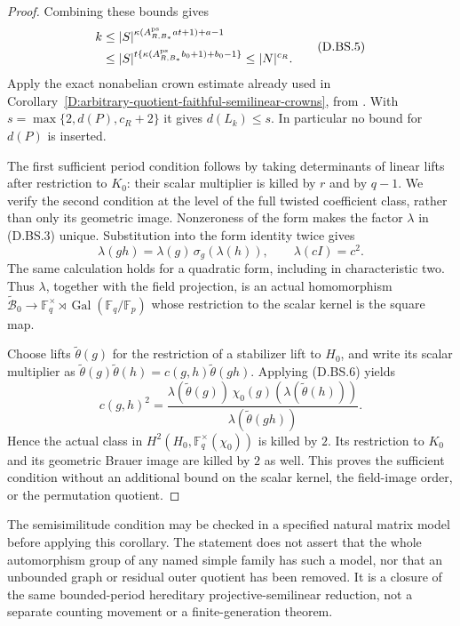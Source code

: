 \begin{proof}
Combining these bounds gives
\[
 \begin{aligned}
 k&\le |S|^{\kappa(A_{R,B_*}^{\rm ps}at+1)+a-1}\\
  &\le |S|^{t\{\kappa(A_{R,B_*}^{\rm ps}b_0+1)+b_0-1\}}
   \le |N|^{c_R}.
 \end{aligned}                                         \tag{D.BS.5}
\]
Apply the exact nonabelian crown estimate already
used in
Corollary~\ref{D:arbitrary-quotient-faithful-semilinear-crowns},
from \citet[proof of Proposition 2.6(ii),
equations (2.1)--(2.2), pp.11--13]{LucchiniMarionTracey2020D}.
With $s=\max\{2,d(P),c_R+2\}$ it gives $d(L_k)\le s$.
In particular no bound for $d(P)$ is inserted.

The first sufficient period condition follows by
taking determinants of linear lifts after restriction
to $K_0$: their scalar multiplier is killed by $r$
and by $q-1$.
We verify the second condition at the level of the
full twisted coefficient class, rather than only its
geometric image. Nonzeroness of the form makes the
factor $\lambda$ in (D.BS.3) unique. Substitution
into the form identity twice gives
\[
 \lambda(gh)=\lambda(g)\,\sigma_g(\lambda(h)),
 \qquad \lambda(cI)=c^2 .
                                                        \tag{D.BS.6}
\]
The same calculation holds for a quadratic form,
including in characteristic two. Thus $\lambda$,
together with the field projection, is an actual
homomorphism
$\widetilde{\mathcal B}_0\to
\mathbb F_q^\times\rtimes\operatorname{Gal}(\mathbb F_q/\mathbb F_p)$
whose restriction to the scalar kernel is the square
map.

Choose lifts $\widetilde\theta(g)$ for the restriction
of a stabilizer lift to $H_0$, and write its scalar
multiplier as
$\widetilde\theta(g)\widetilde\theta(h)
=c(g,h)\widetilde\theta(gh)$.
Applying (D.BS.6) yields
\[
 c(g,h)^2=
 \frac{\lambda(\widetilde\theta(g))\,
       \chi_0(g)(\lambda(\widetilde\theta(h)))}
      {\lambda(\widetilde\theta(gh))}.
                                                        \tag{D.BS.7}
\]
Hence the actual class in
$H^2(H_0,\mathbb F_q^\times(\chi_0))$ is killed by
$2$. Its restriction to $K_0$ and its geometric
Brauer image are killed by $2$ as well. This proves
the sufficient condition without an additional
bound on the scalar kernel, the field-image order,
or the permutation quotient.
\end{proof}

\begin{remark}
The semisimilitude condition may be checked in a
specified natural matrix model before applying this
corollary. The statement does not assert that the
whole automorphism group of any named simple family
has such a model, nor that an unbounded graph or
residual outer quotient has been removed.
It is a closure of the same bounded-period hereditary
projective-semilinear reduction, not a separate
counting movement or a finite-generation theorem.
\end{remark}
